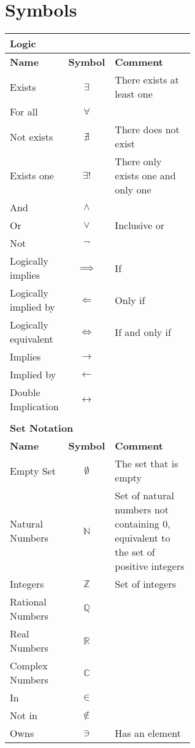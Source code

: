 \documentclass[12pt, english]{book}
\begin{document}
	\section*{Symbols}
	\begin{tabularx}{\textwidth}{ l c p{0.6\linewidth}}
		\multicolumn{3}{l}{\textbf{{\large Logic}}} \\ [10pt]
		\hline
		\textbf{Name} & \textbf{Symbol} & \textbf{Comment} \\
		\hline
		Exists 					& $\exists$ 		& There exists at least one\\
		For all 				& $\forall$ 		& \\
		Not exists 				& $\nexists$ 		& There does not exist\\ 
		Exists one				& $\exists!$ 		& There only exists one and only one \\
		And 					& $\land$			& \\
		Or						& $\lor$			& Inclusive or \\
		Not 					& $\neg$			& \\
		Logically implies 		& $\implies$ 		& If \\
		Logically implied by 	& $\Longleftarrow$ 	& Only if \\  
		Logically equivalent 	& $\iff$ 			& If and only if \\
		Implies 				& $\longrightarrow$	& \\
		Implied by 				& $\longleftarrow$ 	& \\  
		Double Implication 		& $\longleftrightarrow$	& \\
		\hline	
		
		& & \\
		\multicolumn{3}{l}{\textbf{{\large Set Notation}}} \\ [10pt]
		\hline
		\textbf{Name} & \textbf{Symbol} & \textbf{Comment} \\
		\hline
 		Empty Set 				& $\emptyset$ 		& The set that is empty \\
 		Natural Numbers 		& $\mathbb{N}$		& Set of natural numbers not containing 0, equivalent to the set of positive integers \\
 		Integers 				& $\mathbb{Z}$		& Set of integers \\
 		Rational Numbers 		& $\mathbb{Q}$		& \\
 		Real Numbers 			& $\mathbb{R}$		& \\
 		Complex Numbers 		& $\mathbb{C}$		& \\
 		
 		In 						& $\in$ 			& \\
 		Not in 					& $\nin$			& \\
 		Owns 					& $\ni$				& Has an element \\
 		

\end{tabularx}
\end{document}
